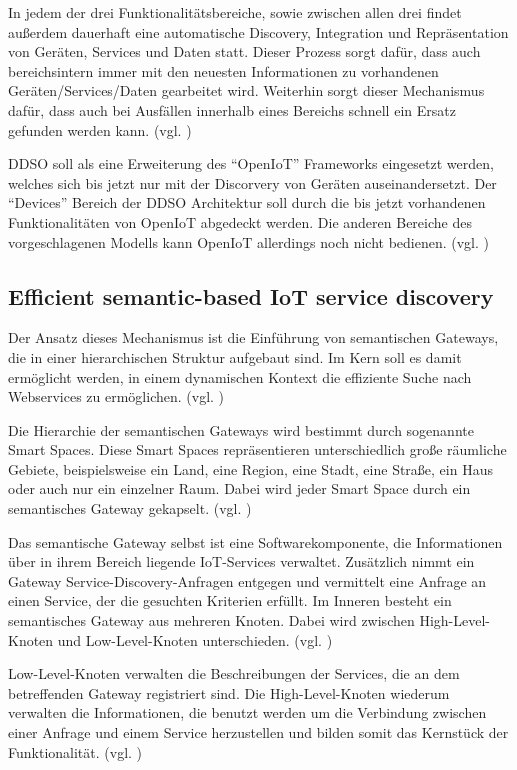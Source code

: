 \documentclass[conference,compsoc]{IEEEtran}
\begin{document}
In jedem der drei Funktionalitätsbereiche, sowie zwischen allen drei findet außerdem dauerhaft eine automatische Discovery, Integration und Repräsentation von Geräten, Services und Daten statt. Dieser Prozess sorgt dafür, dass auch bereichsintern immer mit den neuesten Informationen zu vorhandenen Geräten/Services/Daten gearbeitet wird. Weiterhin sorgt dieser Mechanismus dafür, dass auch bei Ausfällen innerhalb eines Bereichs schnell ein Ersatz gefunden werden kann. (vgl. \cite{DDSO})

DDSO soll als eine Erweiterung des \enquote{OpenIoT} Frameworks eingesetzt werden, welches sich bis jetzt nur mit der Discorvery von Geräten auseinandersetzt. Der \enquote{Devices} Bereich der DDSO Architektur soll durch die bis jetzt vorhandenen Funktionalitäten von OpenIoT abgedeckt werden. Die anderen Bereiche des vorgeschlagenen Modells kann OpenIoT allerdings noch nicht bedienen. (vgl. \cite{DDSO})

\subsection{Efficient semantic-based IoT service discovery}

Der Ansatz dieses Mechanismus ist die Einführung von semantischen Gateways, die in einer hierarchischen Struktur aufgebaut sind. Im Kern soll es damit ermöglicht werden, in einem dynamischen Kontext die effiziente Suche nach Webservices zu ermöglichen. (vgl. \cite{efficientSemantic})

Die Hierarchie der semantischen Gateways wird bestimmt durch sogenannte Smart Spaces. Diese Smart Spaces repräsentieren unterschiedlich große räumliche Gebiete, beispielsweise ein Land, eine Region, eine Stadt, eine Straße, ein Haus oder auch nur ein einzelner Raum. Dabei wird jeder Smart Space durch ein semantisches Gateway gekapselt. (vgl. \cite{efficientSemantic})

Das semantische Gateway selbst ist eine Softwarekomponente, die Informationen über in ihrem Bereich liegende IoT-Services verwaltet. Zusätzlich nimmt ein Gateway Service-Discovery-Anfragen entgegen und vermittelt eine Anfrage an einen Service, der die gesuchten Kriterien erfüllt. Im Inneren besteht ein semantisches Gateway aus mehreren Knoten. Dabei wird zwischen High-Level-Knoten und Low-Level-Knoten unterschieden. (vgl. \cite{efficientSemantic})

Low-Level-Knoten verwalten die Beschreibungen der Services, die an dem betreffenden Gateway registriert sind. Die High-Level-Knoten wiederum verwalten die Informationen, die benutzt werden um die Verbindung zwischen einer Anfrage und einem Service herzustellen und bilden somit das Kernstück der Funktionalität. (vgl. \cite{efficientSemantic})
\end{document}
